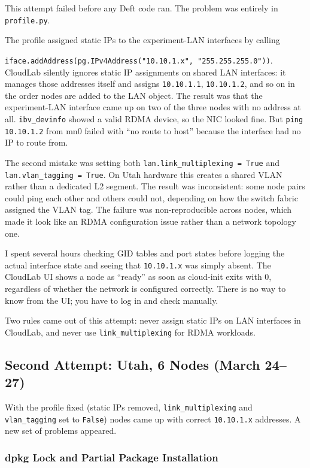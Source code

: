 \documentclass[10pt]{article}
\begin{document}
This attempt failed before any Deft code ran.
The problem was entirely in \texttt{profile.py}.

The profile assigned static IPs to the experiment-LAN interfaces by calling

\texttt{iface.addAddress(pg.IPv4Address("10.10.1.x", "255.255.255.0"))}.
CloudLab silently ignores static IP assignments on shared LAN interfaces: it manages
those addresses itself and assigns \texttt{10.10.1.1}, \texttt{10.10.1.2}, and so on
in the order nodes are added to the LAN object.
The result was that the experiment-LAN interface came up on two of the three nodes
with no address at all.
\texttt{ibv\_devinfo} showed a valid RDMA device, so the NIC looked fine.
But \texttt{ping 10.10.1.2} from mn0 failed with ``no route to host'' because
the interface had no IP to route from.

The second mistake was setting both \texttt{lan.link\_multiplexing = True} and
\texttt{lan.vlan\_tagging = True}.
On Utah hardware this creates a shared VLAN rather than a dedicated L2 segment.
The result was inconsistent: some node pairs could ping each other and others could not,
depending on how the switch fabric assigned the VLAN tag.
The failure was non-reproducible across nodes, which made it look like an RDMA
configuration issue rather than a network topology one.

I spent several hours checking GID tables and port states before logging the actual
interface state and seeing that \texttt{10.10.1.x} was simply absent.
The CloudLab UI shows a node as ``ready'' as soon as cloud-init exits with 0,
regardless of whether the network is configured correctly.
There is no way to know from the UI; you have to log in and check manually.

Two rules came out of this attempt: never assign static IPs on LAN interfaces in
CloudLab, and never use \texttt{link\_multiplexing} for RDMA workloads.

\subsection{Second Attempt: Utah, 6 Nodes (March 24--27)}

With the profile fixed (static IPs removed, \texttt{link\_multiplexing} and
\texttt{vlan\_tagging} set to \texttt{False}) nodes came up with correct
\texttt{10.10.1.x} addresses.
A new set of problems appeared.

\subsubsection{dpkg Lock and Partial Package Installation}
\end{document}
